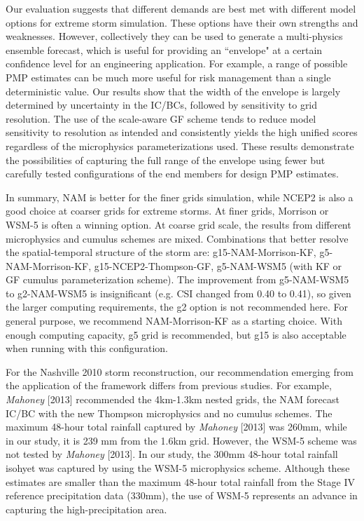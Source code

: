 Our evaluation suggests that different demands are best met with different model options for extreme storm simulation. These options have their own strengths and weaknesses. However, collectively they can be used to generate a multi-physics ensemble forecast, which is useful for providing an ``envelope" at a certain confidence level for an engineering application. For example, a range of possible PMP estimates can be much more useful for risk management than a single deterministic value. Our results show that the width of the envelope is largely determined by uncertainty in the IC/BCs, followed by sensitivity to grid resolution. The use of the scale-aware GF scheme tends to reduce model sensitivity to resolution as intended and consistently yields the high unified scores regardless of the microphysics parameterizations used. These results demonstrate the possibilities of capturing the full range of the envelope using fewer but carefully tested configurations of the end members for design PMP estimates.

In summary, NAM is better for the finer grids simulation, while NCEP2 is also a good choice at coarser grids for extreme storms. At finer grids, Morrison or WSM-5 is often a winning option. At coarse grid scale, the results from different microphysics and cumulus schemes are mixed. Combinations that better resolve the spatial-temporal structure of the storm are: g15-NAM-Morrison-KF, g5-NAM-Morrison-KF, g15-NCEP2-Thompson-GF, g5-NAM-WSM5 (with KF or GF cumulus parameterization scheme). The improvement from g5-NAM-WSM5 to g2-NAM-WSM5 is insignificant (e.g. CSI changed from 0.40 to 0.41), so given the larger computing requirements, the g2 option is not recommended here. For general purpose, we recommend NAM-Morrison-KF as a starting choice. With enough computing capacity, g5 grid is recommended, but g15 is also acceptable when running with this configuration.

For the Nashville 2010 storm reconstruction, our recommendation emerging from the application of the framework differs from previous studies. For example, \textit{Mahoney} [2013] recommended the 4km-1.3km nested grids, the NAM forecast IC/BC with the new Thompson microphysics and no cumulus schemes. The maximum 48-hour total rainfall captured by \textit{Mahoney} [2013] was 260mm, while in our study, it is 239 mm from the 1.6km grid. However, the WSM-5 scheme was not tested by \textit{Mahoney} [2013]. In our study, the 300mm 48-hour total rainfall isohyet was captured by using the WSM-5 microphysics scheme. Although these estimates are smaller than the maximum 48-hour total rainfall from the Stage IV reference precipitation data (330mm), the use of WSM-5 represents an advance in capturing the high-precipitation area.

